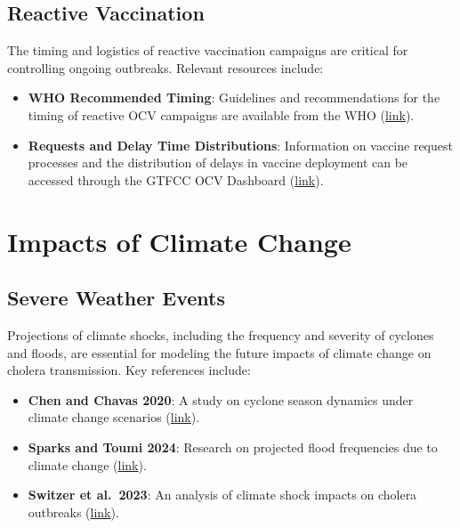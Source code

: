 \documentclass[
]{book}
\providecommand{\tightlist}{%
  \setlength{\itemsep}{0pt}\setlength{\parskip}{0pt}}
\begin{document}
\subsection{Reactive Vaccination}\label{reactive-vaccination}

The timing and logistics of reactive vaccination campaigns are critical for controlling ongoing outbreaks. Relevant resources include:

\begin{itemize}
\tightlist
\item
  \textbf{WHO Recommended Timing}: Guidelines and recommendations for the timing of reactive OCV campaigns are available from the WHO (\href{https://www.who.int/groups/icg/cholera/stockpiles}{link}).
\item
  \textbf{Requests and Delay Time Distributions}: Information on vaccine request processes and the distribution of delays in vaccine deployment can be accessed through the GTFCC OCV Dashboard (\href{https://apps.epicentre-msf.org/public/app/gtfcc}{link}).
\end{itemize}

\section{Impacts of Climate Change}\label{impacts-of-climate-change-1}

\subsection{Severe Weather Events}\label{severe-weather-events}

Projections of climate shocks, including the frequency and severity of cyclones and floods, are essential for modeling the future impacts of climate change on cholera transmission. Key references include:

\begin{itemize}
\tightlist
\item
  \textbf{Chen and Chavas 2020}: A study on cyclone season dynamics under climate change scenarios (\href{https://journals.ametsoc.org/view/journals/atsc/77/8/jasD190320.xml}{link}).
\item
  \textbf{Sparks and Toumi 2024}: Research on projected flood frequencies due to climate change (\href{https://www.nature.com/articles/s41597-024-03250-y}{link}).
\item
  \textbf{Switzer et al.~2023}: An analysis of climate shock impacts on cholera outbreaks (\href{https://www.nature.com/articles/s43247-023-00844-z}{link}).
\end{itemize}
\end{document}

